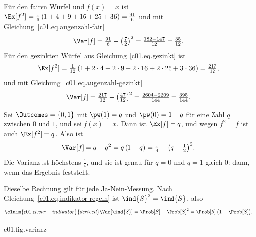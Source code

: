 \begin{example}\label{c01.ex.wuerfel-varianz}
  Für den fairen Würfel und $f(x) = x$ ist
  $\Ex[f^2] = \tfrac16\,(1 + 4 + 9 + 16 + 25 + 36) = \tfrac{91}{6}$ und mit
  Gleichung~\eqref{c01.eq.augenzahl-fair}
  \begin{equation}\label{c01.eq.varianz-fair}
    \Var[f] = \tfrac{91}{6} - \bigl(\tfrac72\bigr)^2 = \tfrac{182 - 147}{12} = \tfrac{35}{12} .
  \end{equation}
  Für den gezinkten Würfel aus Gleichung~\eqref{c01.eq.gezinkt} ist
  \begin{equation*}
    \Ex[f^2] = \tfrac{1}{12}\,(1 + 2\cdot 4 + 2\cdot 9 + 2\cdot 16 + 2\cdot 25 + 3\cdot 36)
    = \tfrac{217}{12} ,
  \end{equation*}
  und mit Gleichung~\eqref{c01.eq.augenzahl-gezinkt}
  \begin{equation}\label{c01.eq.varianz-gezinkt}
    \Var[f] = \tfrac{217}{12} - \bigl(\tfrac{47}{12}\bigr)^2
            = \tfrac{2604 - 2209}{144} = \tfrac{395}{144} .
  \end{equation}
\end{example}

\begin{example}\label{c01.ex.muenze}
  Sei $\Outcomes = \{0, 1\}$ mit $\pw(1) = q$ und $\pw(0) = 1 - q$ für eine Zahl $q$
  zwischen $0$ und $1$, und sei $f(x) = x$. Dann ist $\Ex[f] = q$, und wegen $f^2 = f$ ist
  auch $\Ex[f^2] = q$. Also ist
  \begin{equation}\label{c01.eq.zwei-ergebnisse}
    \Var[f] = q - q^2 = q\,(1 - q) = \tfrac14 - \bigl(q - \tfrac12\bigr)^2 .
  \end{equation}
  Die Varianz ist höchstens $\tfrac14$, und sie ist genau für $q = 0$ und $q = 1$ gleich
  $0$: dann, wenn das Ergebnis feststeht.
\end{example}

Dieselbe Rechnung gilt für jede Ja-Nein-Messung. Nach
Gleichung~\eqref{c01.eq.indikator-regeln} ist $\ind{S}^2 = \ind{S}$, also
\begin{equation}\label{c01.eq.var-indikator}\claim{c01.cl.var-indikator}{derived}
  \Var[\ind{S}] = \Prob[S] - \Prob[S]^2 = \Prob[S]\,\bigl(1 - \Prob[S]\bigr) .
\end{equation}

\begin{tpcfigure}{c01.fig.varianz}
  \caption{(a), (b) Zwei Gewichte mit demselben Erwartungswert $\tfrac72$ der Augenzahl
    $f(x) = x$ (gestrichelte Linie) und verschiedener Varianz: der faire Würfel aus
    Gleichung~\eqref{c01.eq.varianz-fair} und ein Gewicht, das je zur Hälfte auf $3$ und
    $4$ liegt; für dieses ist $\Ex[f^2] = \tfrac{9 + 16}{2}$ und
    $\Var[f] = \tfrac{25}{2} - \tfrac{49}{4} = \tfrac14$. (c) Die Varianz
    einer Ja-Nein-Messung als Funktion von $q = \Prob[S]$ nach
    Gleichung~\eqref{c01.eq.var-indikator}: Sie verschwindet genau an den beiden Enden, wo
    die Antwort feststeht, und ist bei $q = \tfrac12$ am größten.}
\end{tpcfigure}

